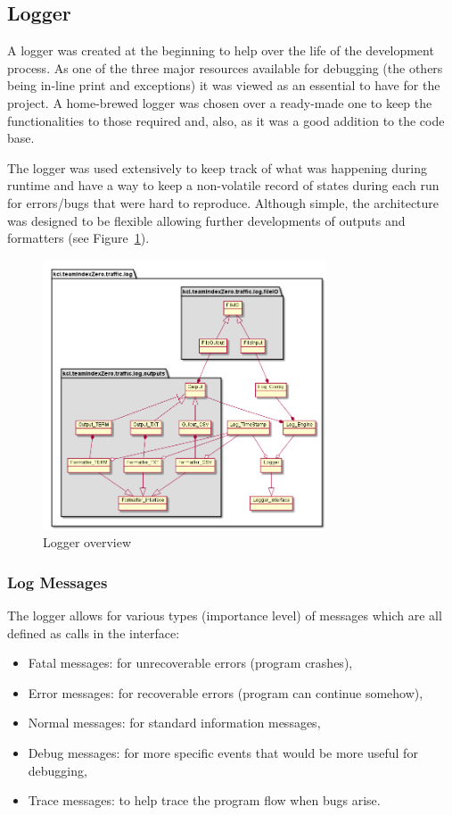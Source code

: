 \subsection{Logger}

A logger was created at the beginning to help over the life of the development process. As one of the three major resources available for debugging (the others being in-line print and exceptions) it was viewed as an essential to have for the project. A home-brewed logger was chosen over a ready-made one to keep the functionalities to those required and, also, as it was a good addition to the code base.

The logger was used extensively to keep track of what was happening during runtime and have a way to keep a non-volatile record of states during each run for errors/bugs that were hard to reproduce. Although simple, the architecture was designed to be flexible allowing further developments of outputs and formatters (see Figure~\ref{fig:logger_overview}).

\begin{figure}[!h]
	\vspace{1.5em}
  	\caption{Logger overview}
  	\label{fig:logger_overview}
  	\centering
	\includegraphics[width=0.75\textwidth]{figs/logger/LogModuleObjectDiagram.png}
  	\vspace{1.5em}
\end{figure}

\subsubsection{Log Messages}
The logger allows for various types (importance level) of messages which are all defined as calls in the interface:
\begin{itemize}
	\item Fatal messages: for unrecoverable errors (program crashes),
	\item Error messages: for recoverable errors (program can continue somehow),
	\item Normal messages: for standard information messages,
	\item Debug messages: for more specific events that would be more useful for debugging,
	\item Trace messages: to help trace the program flow when bugs arise.
\end{itemize}

